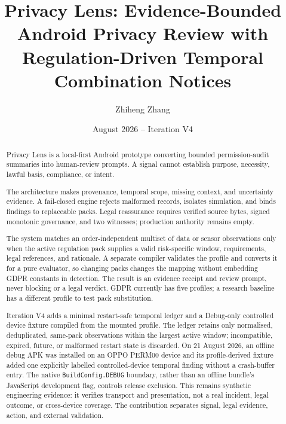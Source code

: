\documentclass[11pt,a4paper]{article}
\title{Privacy Lens: Evidence-Bounded Android Privacy Review with Regulation-Driven Temporal Combination Notices}
\author{Zhiheng Zhang}
\date{August 2026 -- Iteration V4}
\begin{document}
\maketitle
\begin{abstract}
\small\singlespacing
Privacy Lens is a local-first Android prototype converting bounded permission-audit summaries into human-review prompts. A signal cannot establish purpose, necessity, lawful basis, compliance, or intent.

The architecture makes provenance, temporal scope, missing context, and uncertainty evidence. A fail-closed engine rejects malformed records, isolates simulation, and binds findings to replaceable packs. Legal reassurance requires verified source bytes, signed monotonic governance, and two witnesses; production authority remains empty.

The system matches an order-independent multiset of data or sensor observations only when the active regulation pack supplies a valid risk-specific window, requirements, legal references, and rationale. A separate compiler validates the profile and converts it for a pure evaluator, so changing packs changes the mapping without embedding GDPR constants in detection. The result is an evidence receipt and review prompt, never blocking or a legal verdict. GDPR currently has five profiles; a research baseline has a different profile to test pack substitution.

Iteration V4 adds a minimal restart-safe temporal ledger and a Debug-only controlled device fixture compiled from the mounted profile. The ledger retains only normalised, deduplicated, same-pack observations within the largest active window; incompatible, expired, future, or malformed restart state is discarded. On 21 August 2026, an offline debug APK was installed on an OPPO PERM00 device and its profile-derived fixture added one explicitly labelled controlled-device temporal finding without a crash-buffer entry. The native \texttt{BuildConfig.DEBUG} boundary, rather than an offline bundle's JavaScript development flag, controls release exclusion. This remains synthetic engineering evidence: it verifies transport and presentation, not a real incident, legal outcome, or cross-device coverage. The contribution separates signal, legal evidence, action, and external validation.
\end{abstract}
\newpage
\tableofcontents
\newpage







{\small


}
\end{document}
